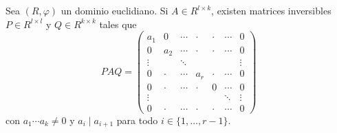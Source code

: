 \begin{theorem}
Sea $(R,\varphi)$ un dominio euclidiano. Si $A\in R^{l\times k}$,  
existen matrices inversibles $P\in R^{l\times l}$ y $Q\in R^{k\times k}$ tales que
\[
PAQ=\begin{pmatrix}
a_1 & 0 & \cdots & \cdot & \cdot & \cdots & 0\\
0 & a_2 & \cdots & \cdot & \cdot & \cdots & 0\\
\vdots && \ddots &  & & & \vdots\\	
0 & \cdot & \cdots & a_r & \cdot & \cdots & 0\\	
0 & \cdot & \cdots & \cdot & 0 & \cdots & 0\\	
\vdots &&&&&\ddots &\vdots\\
0 & \cdot & \cdots & \cdot & \cdot & \cdots & 0
\end{pmatrix}
\]
con $a_1\cdots a_k\ne 0$ y $a_i\mid a_{i+1}$ para todo $i\in\{1,\dots,r-1\}$. 
\end{theorem}

